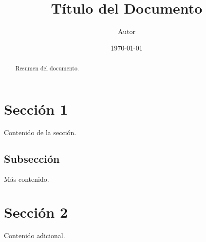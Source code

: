 \documentclass[a4paper,12pt]{article}
\title{Título del Documento}
\author{Autor}
\date{\today}
\begin{document}
\maketitle

\begin{abstract}
Resumen del documento.
\end{abstract}

\section{Sección 1}
Contenido de la sección.

\subsection{Subsección}
Más contenido.

\section{Sección 2}
Contenido adicional.
\end{document}
